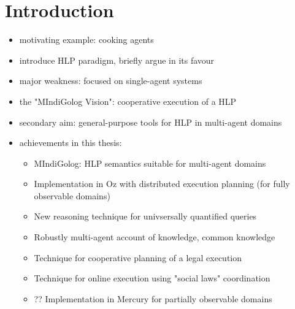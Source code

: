 \chapter{Introduction}

\begin{itemize}
\item motivating example: cooking agents
\item introduce HLP paradigm, briefly argue in its favour
\item major weakness: focused on single-agent systems
\item the "MIndiGolog Vision": cooperative execution of a HLP
\item secondary aim: general-purpose tools for HLP in multi-agent domains
\item achievements in this thesis:
  \begin{itemize}
  \item MIndiGolog: HLP semantics suitable for multi-agent domains
  \item Implementation in Oz with distributed execution planning (for fully observable domains)
  \item New reasoning technique for univsersally quantified queries
  \item Robustly multi-agent account of knowledge, common knowledge
  \item Technique for cooperative planning of a legal execution
  \item Technique for online execution using "social laws" coordination
  \item ?? Implementation in Mercury for partially observable domains
  \end{itemize}
\end{itemize}

